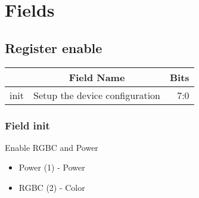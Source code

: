 \documentclass[a4paper,12pt,oneside,pdflatex,italian,final,twocolumn]{article}
\begin{document}
\raggedright

\section{Fields}

 


\raggedright

\subsection{Register enable}
\centering
\begin{tabular}{lcr}
\toprule
  & Field Name & Bits \\
\midrule
init & Setup the device configuration & 
7:0
\\
\bottomrule

\end{tabular}


\raggedright

\subsubsection{Field init }

Enable RGBC and Power

\begin{itemize}
\item Power (1) - Power
\item RGBC (2) - Color
\end{itemize}
\end{document}
